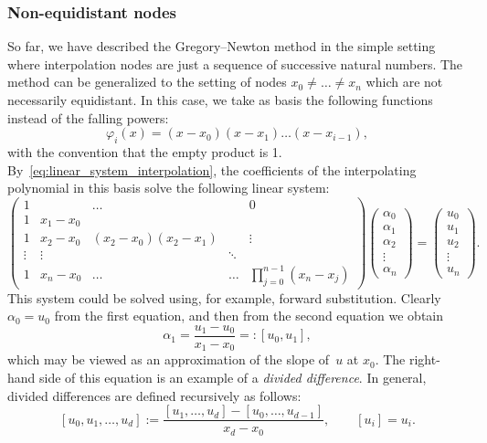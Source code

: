 \subsubsection*{Non-equidistant nodes}%
So far,
we have described the Gregory--Newton method in the simple setting where interpolation nodes are just a sequence of successive natural numbers.
The method can be generalized to the setting of nodes $x_0 \neq \dotsc \neq x_n$ which are not necessarily equidistant.
In this case, we take as basis the following functions instead of the falling powers:
\begin{equation}
    \label{eq:basis_newton}
    \varphi_{i}(x) = (x - x_0) (x - x_1) \dotsc (x - x_{i-1}),
\end{equation}
with the convention that the empty product is 1.
By~\eqref{eq:linear_system_interpolation},
the coefficients of the interpolating polynomial in this basis solve the following linear system:
\begin{equation}
    \label{eq:matrix_newton}
    \begin{pmatrix}
        1 &         & \ldots &        & 0  \\
        1 & x_1-x_0 &        &        &    \\
        1 & x_2-x_0 & (x_2-x_0)(x_2-x_1) &        & \vdots   \\
        \vdots & \vdots  &        & \ddots &    \\
        1 & x_n-x_0 & \ldots & \ldots & \prod_{j=0}^{n-1}(x_n - x_j)
    \end{pmatrix}
    \begin{pmatrix}
        \alpha_0 \\
        \alpha_1 \\
        \alpha_2 \\
        \vdots \\
        \alpha_n
    \end{pmatrix}
    =
    \begin{pmatrix}
        u_0 \\
        u_1 \\
        u_2 \\
        \vdots \\
        u_n
    \end{pmatrix}.
\end{equation}
This system could be solved using, for example, forward substitution.
Clearly $\alpha_0 = u_0$ from the first equation,
and then from the second equation we obtain
\[
    \alpha_1 = \frac{u_1 - u_0}{x_1 - x_0} =: [u_0, u_1],
\]
which may be viewed as an approximation of the slope of~$u$ at $x_0$.
The right-hand side of this equation is an example of a \emph{divided difference}.
In general, divided differences are defined recursively as follows:
\begin{equation}
    \label{eq:definition_divided_difference}
    [u_{0}, u_{1}, \dotsc, u_{d}] := \frac{[u_{1}, \dotsc, u_{d}] - [u_{0}, \dotsc, u_{d-1}]}{x_{d}-x_{0}}, \qquad [u_i] = u_i.
\end{equation}

